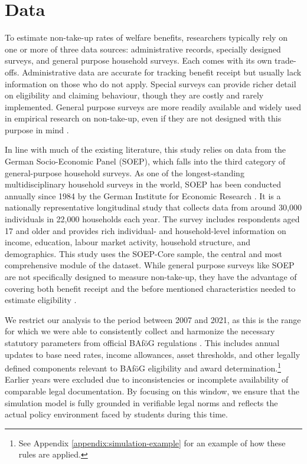%
%




\section{Data}
To estimate non-take-up rates of welfare benefits, researchers typically rely on one or more of three data sources: administrative records, specially designed surveys, and general purpose household surveys. 
Each comes with its own trade-offs. 
Administrative data are accurate for tracking benefit receipt but usually lack information on those who do not apply. 
Special surveys can provide richer detail on eligibility and claiming behaviour, though they are costly and rarely implemented. 
General purpose surveys are more readily available and widely used in empirical research on non-take-up, even if they are not designed with this purpose in mind \citep{mechelen_who_2017}.

In line with much of the existing literature, this study relies on data from the German Socio-Economic Panel (SOEP), which falls into the third category of general-purpose household surveys. 
As one of the longest-standing multidisciplinary household surveys in the world, SOEP has been conducted annually since 1984 by the German Institute for Economic Research \citep{soepcore_v39}. 
It is a nationally representative longitudinal study that collects data from around 30,000 individuals in 22,000 households each year. 
The survey includes respondents aged 17 and older and provides rich individual- and household-level information on income, education, labour market activity, household structure, and demographics. 
This study uses the SOEP-Core sample, the central and most comprehensive module of the dataset. While general purpose surveys like SOEP are not specifically designed to measure non-take-up, they have the advantage of covering both benefit receipt and the before mentioned characteristics needed to estimate eligibility \citep{mechelen_who_2017}.

We restrict our analysis to the period between 2007 and 2021, as this is the range for which we were able to consistently collect and harmonize the necessary statutory parameters from official BAföG regulations \citep{bafoeg_law}. This includes annual updates to base need rates, income allowances, asset thresholds, and other legally defined components relevant to BAföG eligibility and award determination.\footnote{
  See Appendix \ref{appendix:simulation-example} for an example of how these rules are applied.
}
Earlier years were excluded due to inconsistencies or incomplete availability of comparable legal documentation. 
By focusing on this window, we ensure that the simulation model is fully grounded in verifiable legal norms and reflects the actual policy environment faced by students during this time.

